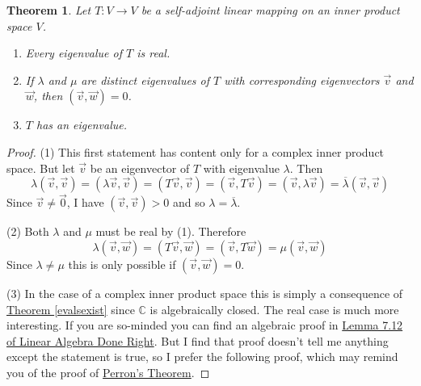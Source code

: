 \documentclass[11pt]{amsbook}
\newtheorem{theorem}{Theorem}[section]
\theoremstyle{definition}
\begin{document}
\begin{theorem}
\label{reality}
Let $T:V \to V$ be a self-adjoint linear mapping on an inner product space $V$.
\begin{enumerate}
\item Every eigenvalue of $T$ is real.
\item If $\lambda$ and $\mu$ are distinct eigenvalues of $T$ with corresponding eigenvectors $\vec{v}$ and $\vec{w}$, then $(\vec{v}, \vec{w}) = 0$.
\item $T$ has an eigenvalue.
\end{enumerate}
\end{theorem}
\begin{proof}
(1) This first statement has content only for a complex inner product space. But let $\vec{v}$ be an eigenvector of $T$ with eigenvalue $\lambda$. Then $$\lambda  (\vec{v}, \vec{v}) = (\lambda \vec{v}, \vec{v}) = (T\vec{v}, \vec{v}) = (\vec{v}, T\vec{v}) = ( \vec{v}, \lambda\vec{v}) = \overline{\lambda} (\vec{v}, \vec{v})$$ Since $\vec{v} \neq \vec{0}$, I have $(\vec{v}, \vec{v})>0$ and so $\lambda = \overline{\lambda}$.

(2) Both $\lambda$ and $\mu$ must be real by (1). Therefore $$\lambda  (\vec{v}, \vec{w})  = (T\vec{v}, \vec{w}) = (\vec{v}, T\vec{w}) = \mu (\vec{v}, \vec{w})$$ Since $\lambda \neq \mu$ this is only possible if $(\vec{v}, \vec{w}) = 0$.

(3) In the case of a complex inner product space this is simply a consequence of \hyperref[evalsexist]{Theorem \ref{evalsexist}} since $\mathbb{C}$ is algebraically closed. The real case is much more interesting. If you are so-minded you can find an algebraic proof in \href{http://catalogue.lib.ed.ac.uk/vwebv/holdingsInfo?searchId=4905&recCount=10&recPointer=0&bibId=1771135}{Lemma 7.12 of Linear Algebra Done Right}. But I find that proof doesn't tell me anything except the statement is true, so I prefer the following proof, which may remind you of the proof of \hyperref[perron]{Perron's Theorem}.


\end{proof}
\end{document}
